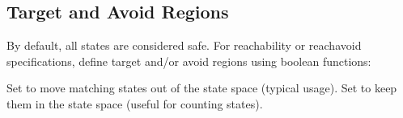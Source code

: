 \documentclass[a4paper,10pt,english]{sphinxmanual}
\begin{document}
\subsection{Target and Avoid Regions}
\label{\detokenize{user-guide/configuration:target-and-avoid-regions}}
\sphinxAtStartPar
By default, all states are considered safe. For reachability or reach\sphinxhyphen{}avoid
specifications, define target and/or avoid regions using boolean functions:

\begin{sphinxVerbatim}[commandchars=\\\{\}]
\end{sphinxVerbatim}

\sphinxAtStartPar
Set  to move matching states out of the state space (typical usage).
Set  to keep them in the state space (useful for counting states).

\sphinxAtStartPar
{}
\end{document}
